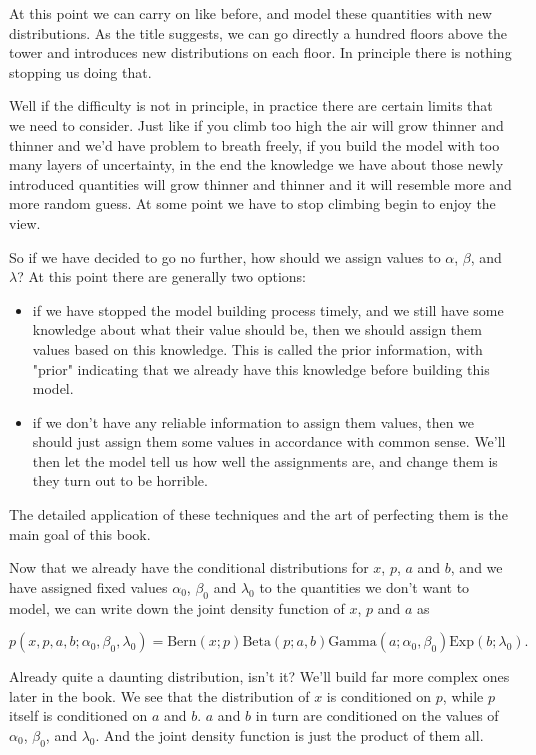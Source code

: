 \documentclass[11pt]{article}
\begin{document}
At this point we can carry on like before, and model these quantities with new distributions. As the title suggests, we can go directly a hundred floors above the tower and introduces new distributions on each floor. In principle there is nothing stopping us doing that.

Well if the difficulty is not in principle, in practice there are certain limits that we need to consider. Just like if you climb too high the air will grow thinner and thinner and we'd have problem to breath freely, if you build the model with too many layers of uncertainty, in the end the knowledge we have about those newly introduced quantities will grow thinner and thinner and it will resemble more and more random guess. At some point we have to stop climbing begin to enjoy the view.

So if we have decided to go no further, how should we assign values to \(\alpha\), \(\beta\), and \(\lambda\)? At this point there are generally two options:

\begin{itemize}
\item if we have stopped the model building process timely, and we still have some knowledge about what their value should be, then we should assign them values based on this knowledge. This is called the prior information, with "prior" indicating that we already have this knowledge before building this model.
\item if we don't have any reliable information to assign them values, then we should just assign them some values in accordance with common sense. We'll then let the model tell us how well the assignments are, and change them is they turn out to be horrible.
\end{itemize}

The detailed application of these techniques and the art of perfecting them is the main goal of this book.

Now that we already have the conditional distributions for \(x\), \(p\), \(a\) and \(b\), and we have assigned fixed values \(\alpha_0\), \(\beta_0\) and \(\lambda_0\) to the quantities we don't want to model, we can write down the joint density function of \(x\), \(p\) and \(a\) as

$$ p(x, p, a, b; \alpha_0, \beta_0, \lambda_0) =
\text{Bern} (x; p) \text{Beta} (p; a, b) \text{Gamma} (a; \alpha_0, \beta_0) \text{Exp} (b; \lambda_0).$$

Already quite a daunting distribution, isn't it? We'll build far more complex ones later in the book. We see that the distribution of \(x\) is conditioned on \(p\), while \(p\) itself is conditioned on \(a\) and \(b\). \(a\) and \(b\) in turn are conditioned on the values of \(\alpha_0\), \(\beta_0\), and \(\lambda_0\). And the joint density function is just the product of them all.
\end{document}
